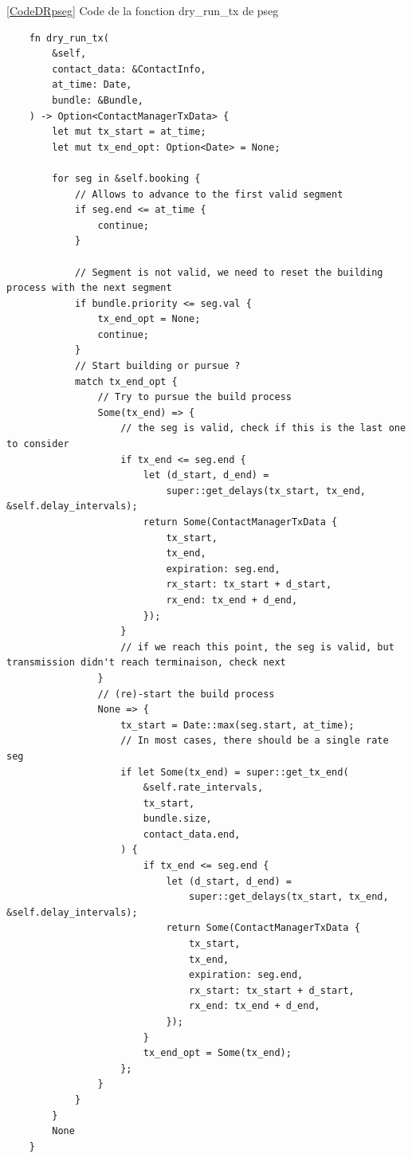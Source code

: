 \documentclass{article}
\begin{document}
\newpage
{}
\label{PsegDR}
\ref{CodeDRpseg}
Code de la fonction dry\_run\_tx de pseg
\begin{verbatim}
    fn dry_run_tx(
        &self,
        contact_data: &ContactInfo,
        at_time: Date,
        bundle: &Bundle,
    ) -> Option<ContactManagerTxData> {
        let mut tx_start = at_time;
        let mut tx_end_opt: Option<Date> = None;

        for seg in &self.booking {
            // Allows to advance to the first valid segment
            if seg.end <= at_time {
                continue;
            }

            // Segment is not valid, we need to reset the building process with the next segment
            if bundle.priority <= seg.val {
                tx_end_opt = None;
                continue;
            }
            // Start building or pursue ?
            match tx_end_opt {
                // Try to pursue the build process
                Some(tx_end) => {
                    // the seg is valid, check if this is the last one to consider
                    if tx_end <= seg.end {
                        let (d_start, d_end) =
                            super::get_delays(tx_start, tx_end, &self.delay_intervals);
                        return Some(ContactManagerTxData {
                            tx_start,
                            tx_end,
                            expiration: seg.end,
                            rx_start: tx_start + d_start,
                            rx_end: tx_end + d_end,
                        });
                    }
                    // if we reach this point, the seg is valid, but transmission didn't reach terminaison, check next
                }
                // (re)-start the build process
                None => {
                    tx_start = Date::max(seg.start, at_time);
                    // In most cases, there should be a single rate seg
                    if let Some(tx_end) = super::get_tx_end(
                        &self.rate_intervals,
                        tx_start,
                        bundle.size,
                        contact_data.end,
                    ) {
                        if tx_end <= seg.end {
                            let (d_start, d_end) =
                                super::get_delays(tx_start, tx_end, &self.delay_intervals);
                            return Some(ContactManagerTxData {
                                tx_start,
                                tx_end,
                                expiration: seg.end,
                                rx_start: tx_start + d_start,
                                rx_end: tx_end + d_end,
                            });
                        }
                        tx_end_opt = Some(tx_end);
                    };
                }
            }
        }
        None
    }
\end{verbatim}
\end{document}
